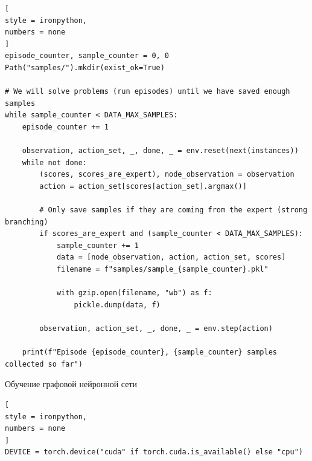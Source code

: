 \documentclass[%
	11pt,
	a4paper,
	utf8,
		]{article}
\begin{document}
\begin{lstlisting}[
style = ironpython,
numbers = none
]
episode_counter, sample_counter = 0, 0
Path("samples/").mkdir(exist_ok=True)

# We will solve problems (run episodes) until we have saved enough samples
while sample_counter < DATA_MAX_SAMPLES:
	episode_counter += 1

	observation, action_set, _, done, _ = env.reset(next(instances))
	while not done:
		(scores, scores_are_expert), node_observation = observation
		action = action_set[scores[action_set].argmax()]

		# Only save samples if they are coming from the expert (strong branching)
		if scores_are_expert and (sample_counter < DATA_MAX_SAMPLES):
			sample_counter += 1
			data = [node_observation, action, action_set, scores]
			filename = f"samples/sample_{sample_counter}.pkl"

			with gzip.open(filename, "wb") as f:
				pickle.dump(data, f)

		observation, action_set, _, done, _ = env.step(action)

	print(f"Episode {episode_counter}, {sample_counter} samples collected so far")
\end{lstlisting}

Обучение графовой нейронной сети
\begin{lstlisting}[
style = ironpython,
numbers = none
]
DEVICE = torch.device("cuda" if torch.cuda.is_available() else "cpu")
\end{lstlisting}
\end{document}
